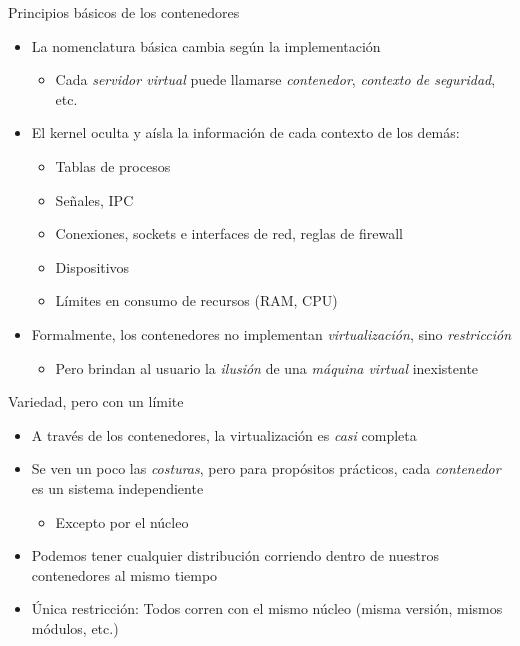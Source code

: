 \documentclass[presentation]{beamer}
\begin{document}
\begin{frame}[label={sec:org468a5cd}]{Principios básicos de los contenedores}
\begin{itemize}
\item La nomenclatura básica cambia según la implementación
\begin{itemize}
\item Cada \emph{servidor virtual} puede llamarse \emph{contenedor}, \emph{contexto de
seguridad}, etc.
\end{itemize}
\item El kernel oculta y aísla la información de cada contexto de los
demás:
\begin{itemize}
\item Tablas de procesos
\item Señales, IPC
\item Conexiones, sockets e interfaces de red, reglas de firewall
\item Dispositivos
\item Límites en consumo de recursos (RAM, CPU)
\end{itemize}
\item Formalmente, los contenedores no implementan \emph{virtualización}, sino
\emph{restricción}
\begin{itemize}
\item Pero brindan al usuario la \emph{ilusión} de una \emph{máquina virtual}
inexistente
\end{itemize}
\end{itemize}
\end{frame}

\begin{frame}[label={sec:org0e492ad}]{Variedad, pero con un límite}
\begin{itemize}
\item A través de los contenedores, la virtualización es \emph{casi} completa
\item Se ven un poco las \emph{costuras}, pero para propósitos prácticos, cada
\emph{contenedor} es un sistema independiente
\begin{itemize}
\item Excepto por el núcleo
\end{itemize}
\item Podemos tener cualquier distribución corriendo dentro de nuestros
contenedores al mismo tiempo
\item Única restricción: Todos corren con el mismo núcleo (misma versión,
mismos módulos, etc.)
\end{itemize}
\end{frame}
\end{document}
